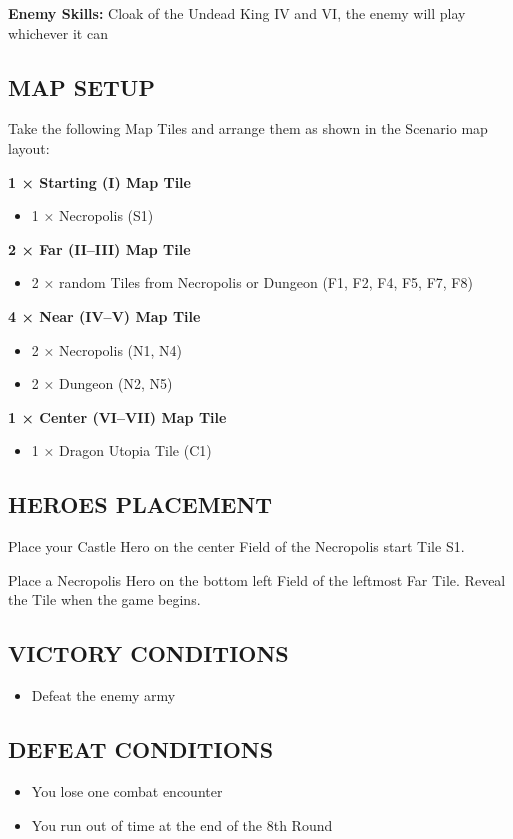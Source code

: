 \begin{multicols*}{2}
\textbf{Enemy Skills:} Cloak of the Undead King IV and VI, the enemy will play whichever it can

\subsection*{\MakeUppercase{Map setup}}

Take the following Map Tiles and arrange them as shown in the Scenario map layout:

\textbf{1 × Starting (I) Map Tile}
\begin{itemize}
    \item 1 × Necropolis (S1)
\end{itemize}

\textbf{2 × Far (II--III) Map Tile}
\begin{itemize}
    \item 2 × random Tiles from Necropolis or Dungeon (F1, F2, F4, F5, F7, F8)
\end{itemize}

\textbf{4 × Near (IV--V) Map Tile}
\begin{itemize}
    \item 2 × Necropolis (N1, N4)
    \item 2 × Dungeon (N2, N5)
\end{itemize}

\textbf{1 × Center (VI--VII) Map Tile}
\begin{itemize}
  \item 1 × Dragon Utopia Tile (C1)
\end{itemize}

\subsection*{\MakeUppercase{Heroes placement}}

Place your Castle Hero on the center Field of the Necropolis start Tile S1.

Place a Necropolis Hero on the bottom left Field of the leftmost Far Tile.
Reveal the Tile when the game begins.

\subsection*{\MakeUppercase{Victory Conditions}}

\begin{itemize}
  \item Defeat the enemy army
\end{itemize}


\subsection*{\MakeUppercase{Defeat Conditions}}
\begin{itemize}
  \item You lose one combat encounter
  \item You run out of time at the end of the 8th Round
\end{itemize}
\end{multicols*}

